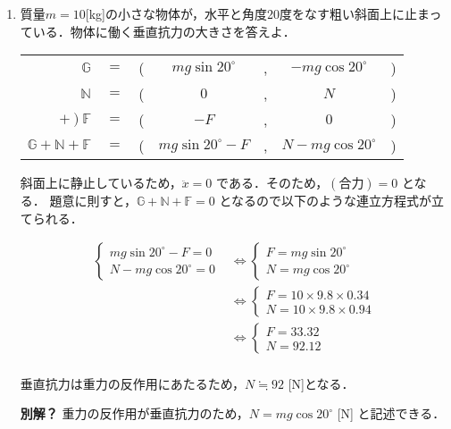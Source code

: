 \documentclass[a4paper,11pt]{ltjsarticle}
\begin{document}
\begin{enumerate}
  \item 質量$m=10$[kg]の小さな物体が，水平と角度20度をなす粗い斜面上に止まっている．物体に働く垂直抗力の大きさを答えよ．
  \begin{table}[hb]
    \centering
    \begin{tabular}{rcccccc}
      $\mathbb{G}$ & $=$ & ( & $mg \sin 20^{\circ}$ & ,& $-mg \cos 20^{\circ}$ & ) \\
      $\mathbb{N}$ & $=$ & ( & $0$ & ,& $N$ & ) \\
      $+\ )\ \mathbb{F}$ & $=$ & ( & $-F$ & ,& $0$ & ) \\
    \hline
      $\mathbb{G+N+F}$ & $=$ & ( & $mg \sin 20^{\circ}-F$ & ,& $N-mg \cos 20^{\circ}$ & ) \\
    \end{tabular}
  \end{table}

  斜面上に静止しているため，$\ddot{x}=0$ である．そのため，$(合力) = 0$ となる．
  題意に則すと，$\mathbb{G+N+F} = 0$ となるので以下のような連立方程式が立てられる．

  \begin{equation*}
    \begin{aligned}
      \begin{cases}
        mg \sin 20^{\circ}-F = 0 \\
        N-mg \cos 20^{\circ} = 0
      \end{cases}
      &\Leftrightarrow
      \begin{cases}
        F = mg \sin 20^{\circ} \\
        N = mg \cos 20^{\circ}
      \end{cases} \\
      &\Leftrightarrow
      \begin{cases}
        F = 10 \times 9.8 \times 0.34 \\
        N = 10 \times 9.8 \times 0.94
      \end{cases} \\
      &\Leftrightarrow
      \begin{cases}
        F = 33.32 \\
        N = 92.12
      \end{cases} \\
    \end{aligned}
  \end{equation*}

  垂直抗力は重力の反作用にあたるため，$N \fallingdotseq 92$ [N]となる．


  \item[\textbf{別解？}] 重力の反作用が垂直抗力のため，$N = mg \cos 20^{\circ}$ [N] と記述できる．

\end{enumerate}
\end{document}
